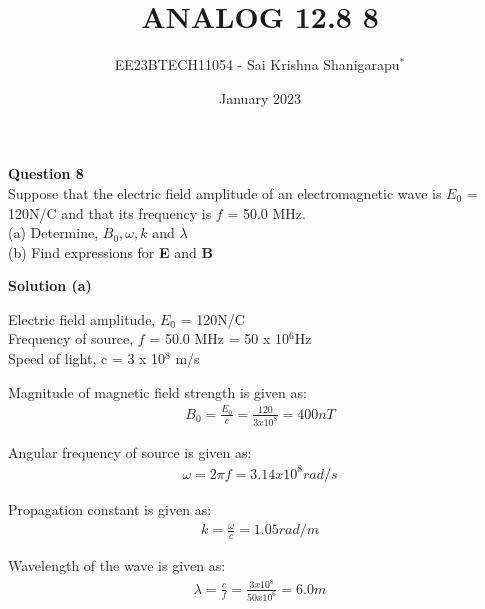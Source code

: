 \documentclass[journal,12pt,twocolumn]{IEEEtran}
\theoremstyle{remark}
\begin{document}

\vspace{3cm}

\title{ANALOG 12.8 8}
\author{EE23BTECH11054 - Sai Krishna Shanigarapu$^{*}$%
}
\date{January 2023}
\maketitle
\newpage
\bigskip

\begin{flushleft}
\textbf{Question 8}\\
Suppose that the electric field amplitude of an electromagnetic wave is $E_0$ = 120N/C and that its frequency is $f$ = 50.0 MHz.\\
(a) Determine, $B_0, \omega, k$ and $\lambda$\\
(b) Find expressions for \textbf{E} and \textbf{B}\\
\end{flushleft}

\bigskip

\begin{flushleft}
\textbf{Solution (a)}\\
\begin{flushleft}
    \begin{table}[h]
	
   \end{table}
    \bigskip
    Electric field amplitude, $E_0$ = 120N/C\\
    Frequency of source, $f$ = 50.0 MHz = 50 x 10$^6$Hz\\
    Speed of light, c = 3 x 10$^8$ m/s\\
\end{flushleft}
Magnitude of magnetic field strength is given as: \\
\begin{align}
    B_0 = \frac{E_0}{c} = \frac{120}{3 x 10^8} = 400nT
\end{align}

Angular frequency of source is given as:
\begin{align}
    \omega = 2\pi f = 3.14 x 10^8 rad/s
\end{align}

Propagation constant is given as:
\begin{align}
     k = \frac{\omega}{c} = 1.05 rad/m
\end{align}

Wavelength of the wave is given as:
\begin{align}
    \lambda = \frac{c}{f} = \frac{3 x 10^8}{50 x 10^6} = 6.0m    
\end{align}

\end{flushleft}
\end{document}
